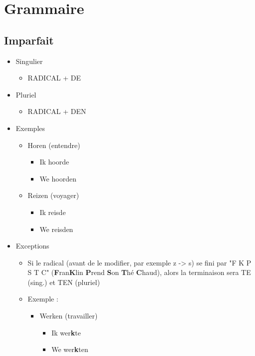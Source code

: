 \documentclass[a4paper]{article}
\begin{document}
\section{Grammaire}
\subsection{Imparfait}
\begin{itemize}[label=\textbullet, font=\Large]
  \item Singulier
  \begin{itemize}[label=, font=\scriptsize]
    \item RADICAL + DE
  \end{itemize}
  \item Pluriel
  \begin{itemize}[label=, font=\scriptsize]
    \item RADICAL + DEN
  \end{itemize}
  \item Exemples
  \begin{itemize}[label=, font=\scriptsize]
    \item Horen (entendre)
    \begin{itemize}
      \item Ik hoorde
      \item We hoorden
    \end{itemize}
    \item Reizen (voyager)
    \begin{itemize}
      \item Ik reisde
      \item We reisden
    \end{itemize}
  \end{itemize}
  \item Exceptions
  \begin{itemize}[label=, font=\scriptsize]
    \item Si le radical (avant de le modifier, par exemple z -> s) se fini par "F K P S T C" (\textbf{F}ran\textbf{K}lin \textbf{P}rend \textbf{S}on \textbf{T}hé \textbf{C}haud), alors la terminaison sera TE (sing.) et TEN (pluriel)
    \item Exemple :
    \begin{itemize}
      \item Werken (travailler)
      \begin{itemize}
        \item Ik wer\textbf{k}te
        \item We wer\textbf{k}ten
      \end{itemize}
    \end{itemize}
  \end{itemize}
\end{itemize}
\end{document}
